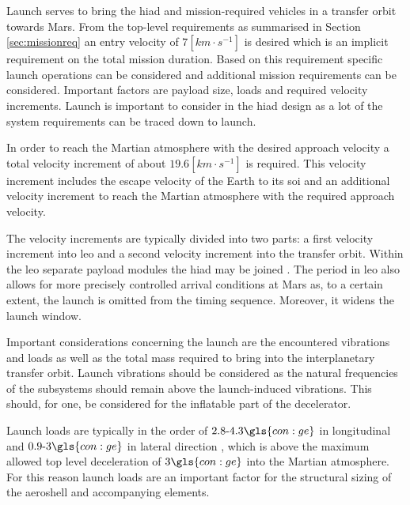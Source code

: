 Launch serves to bring the \gls{hiad} and mission-required vehicles in a transfer orbit towards Mars. From the top-level requirements as summarised in Section \ref{sec:missionreq} an entry velocity of $7 [km\cdot s^{-1}]$ is desired which is an implicit requirement on the total mission duration.
Based on this requirement specific launch operations can be considered and additional mission requirements can be considered. Important factors are payload size, loads and required velocity increments. Launch is important to consider in the \gls{hiad} design as a lot of the system requirements can be traced down to launch.

In order to reach the Martian atmosphere with the desired approach velocity a total velocity increment of about $19.6 [km\cdot s^{-1}]$ is required. This velocity increment includes the escape velocity of the Earth to its \gls{soi} and an additional velocity increment to reach the Martian atmosphere with the required approach velocity.

The velocity increments are typically divided into two parts: a first velocity increment into \gls{leo} and a second velocity increment into the transfer orbit. Within the \gls{leo} separate payload modules the \gls{hiad} may be joined \cite{George2009}. The period in \gls{leo} also allows for more precisely controlled arrival conditions at Mars as, to a certain extent, the launch is omitted from the timing sequence. Moreover, it widens the launch window.


Important considerations concerning the launch are the encountered vibrations and loads as well as the total mass required to bring into the interplanetary transfer orbit. Launch vibrations should be considered as the natural frequencies of the subsystems should remain above the launch-induced vibrations. This should, for one, be considered for the inflatable part of the decelerator.

Launch loads are typically in the order of $2.8\mbox{-}4.3 \gls{con:ge}$ in longitudinal and $0.9\mbox{-}3 \gls{con:ge}$ in lateral direction \cite{Wertz2011}, which is above the maximum allowed top level deceleration of $3\gls{con:ge}$ into the Martian atmosphere. For this reason launch loads are an important factor for the structural sizing of the aeroshell and accompanying elements. 

